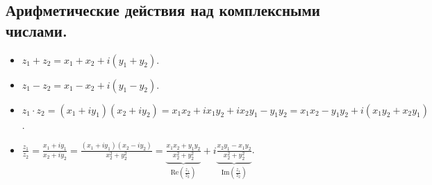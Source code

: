 \subsection{
    Арифметические действия над комплексными числами.
}

\begin{itemize}[nosep]
    \item $z_1 + z_2 = x_1 + x_2 + i(y_1 + y_2)$.
    \item $z_1 - z_2 = x_1 - x_2 + i(y_1 - y_2)$.
    \item $z_1 \cdot z_2 = (x_1 + iy_1)(x_2 + iy_2) = x_1x_2 + ix_1y_2 + ix_2y_1 - y_1y_2 = x_1x_2 - y_1y_2 + i(x_1y_2 + x_2y_1)$.
    \item $\frac{z_1}{z_2} = \frac{x_1 + iy_1}{x_2 + iy_2} = \frac{(x_1 + iy_1)(x_2 - iy_2)}{x_2^2 + y_2^2} = \underbrace{\frac{x_1x_2 + y_1y_2}{x_2^2 + y_2^2}}_{\text{Re}(\frac{z_1}{z_2})} + i\underbrace{\frac{x_2y_1 - x_1y_2}{x_2^2 + y_2^2}}_{\text{Im}(\frac{z_1}{z_2})}$.
\end{itemize}

